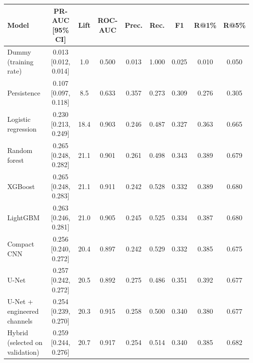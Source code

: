 \begin{tabular}{lcccccccc}
\toprule
Model & PR-AUC [95\% CI] & Lift & ROC-AUC & Prec. & Rec. & F1 & R@1\% & R@5\% \\
\midrule
Dummy (training rate) & 0.013 [0.012, 0.014] & 1.0 & 0.500 & 0.013 & 1.000 & 0.025 & 0.010 & 0.050 \\
Persistence & 0.107 [0.097, 0.118] & 8.5 & 0.633 & 0.357 & 0.273 & 0.309 & 0.276 & 0.305 \\
Logistic regression & 0.230 [0.213, 0.249] & 18.4 & 0.903 & 0.246 & 0.487 & 0.327 & 0.363 & 0.665 \\
Random forest & 0.265 [0.248, 0.282] & 21.1 & 0.901 & 0.261 & 0.498 & 0.343 & 0.389 & 0.679 \\
XGBoost & 0.265 [0.248, 0.283] & 21.1 & 0.911 & 0.242 & 0.528 & 0.332 & 0.389 & 0.680 \\
LightGBM & 0.263 [0.246, 0.281] & 21.0 & 0.905 & 0.245 & 0.525 & 0.334 & 0.387 & 0.680 \\
Compact CNN & 0.256 [0.240, 0.272] & 20.4 & 0.897 & 0.242 & 0.529 & 0.332 & 0.385 & 0.675 \\
U-Net & 0.257 [0.242, 0.272] & 20.5 & 0.892 & 0.275 & 0.486 & 0.351 & 0.392 & 0.677 \\
U-Net + engineered channels & 0.254 [0.239, 0.270] & 20.3 & 0.915 & 0.258 & 0.500 & 0.340 & 0.380 & 0.677 \\
Hybrid (selected on validation) & 0.259 [0.244, 0.276] & 20.7 & 0.917 & 0.254 & 0.514 & 0.340 & 0.385 & 0.682 \\
\bottomrule
\end{tabular}
